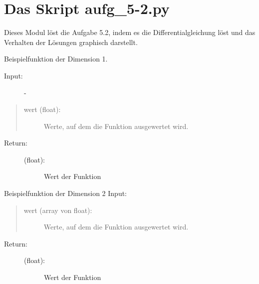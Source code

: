 \documentclass[letterpaper,10pt,ngerman, oneside, openright]{sphinxmanual}
\begin{document}
\chapter{Das Skript aufg\_5-2.py}
\label{\detokenize{index:module-aufg_5_2}}\label{\detokenize{index:das-skript-aufg-5-2-py}}
Dieses Modul löst die Aufgabe 5.2, indem es die Differentialgleichung löst und
das Verhalten der Lösungen graphisch darstellt.

\begin{fulllineitems}
\label{\detokenize{index:aufg_5_2.fntn1}}
Beispielfunktion der Dimension 1.
\begin{description}
\item [{Input:}] -
\end{description}
\begin{quote}
\begin{description}
\item[{wert (float):}] \leavevmode
Werte, auf dem die Funktion ausgewertet wird.

\end{description}
\end{quote}
\begin{description}
\item[{Return:}] \leavevmode\begin{description}
\item[{(float):}] \leavevmode
Wert der Funktion

\end{description}

\end{description}

\end{fulllineitems}


\begin{fulllineitems}
\label{\detokenize{index:aufg_5_2.fntn2}}
Beispielfunktion der Dimension 2
Input:
\begin{quote}
\begin{description}
\item[{wert (array von float):}] \leavevmode
Werte, auf dem die Funktion ausgewertet wird.

\end{description}
\end{quote}
\begin{description}
\item[{Return:}] \leavevmode\begin{description}
\item[{(float):}] \leavevmode
Wert der Funktion

\end{description}

\end{description}

\end{fulllineitems}
\end{document}
